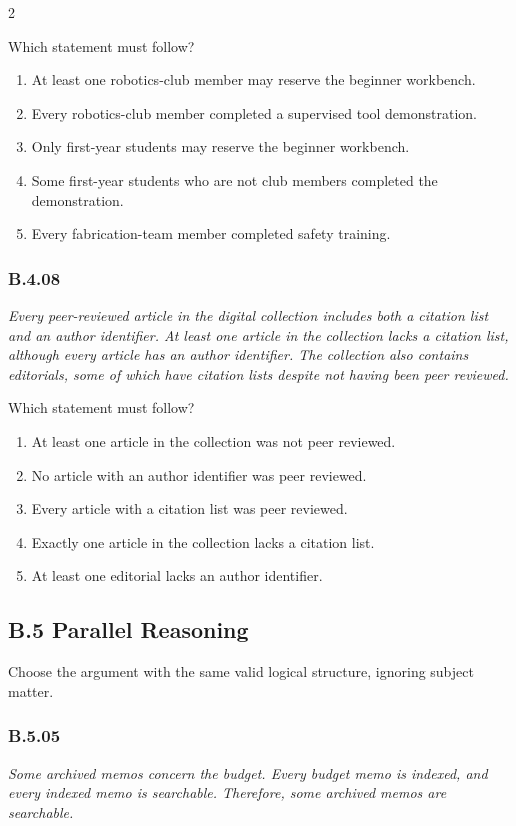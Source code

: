 \documentclass[10pt]{extarticle}
\newcommand{\choice}[1]{\item #1}
\newcommand{\bankitem}[1]{\subsubsection*{#1}}
\begin{document}
\begin{multicols}{2}
\begin{samepage}
Which statement must follow?
\begin{enumerate}[label=(\alph*)]
  \choice{At least one robotics-club member may reserve the beginner workbench.}
  \choice{Every robotics-club member completed a supervised tool demonstration.}
  \choice{Only first-year students may reserve the beginner workbench.}
  \choice{Some first-year students who are not club members completed the demonstration.}
  \choice{Every fabrication-team member completed safety training.}
\end{enumerate}
\end{samepage}\par\smallskip
\begin{samepage}
\bankitem{B.4.08}
\emph{Every peer-reviewed article in the digital collection includes both a citation list and an author identifier. At least one article in the collection lacks a citation list, although every article has an author identifier. The collection also contains editorials, some of which have citation lists despite not having been peer reviewed.}

Which statement must follow?
\begin{enumerate}[label=(\alph*)]
  \choice{At least one article in the collection was not peer reviewed.}
  \choice{No article with an author identifier was peer reviewed.}
  \choice{Every article with a citation list was peer reviewed.}
  \choice{Exactly one article in the collection lacks a citation list.}
  \choice{At least one editorial lacks an author identifier.}
\end{enumerate}
\end{samepage}\par\smallskip
\subsection*{B.5 Parallel Reasoning}
Choose the argument with the same valid logical structure, ignoring subject matter.
\begin{samepage}
\bankitem{B.5.05}
\emph{Some archived memos concern the budget. Every budget memo is indexed, and every indexed memo is searchable. Therefore, some archived memos are searchable.}


\end{samepage}
\end{multicols}
\end{document}
